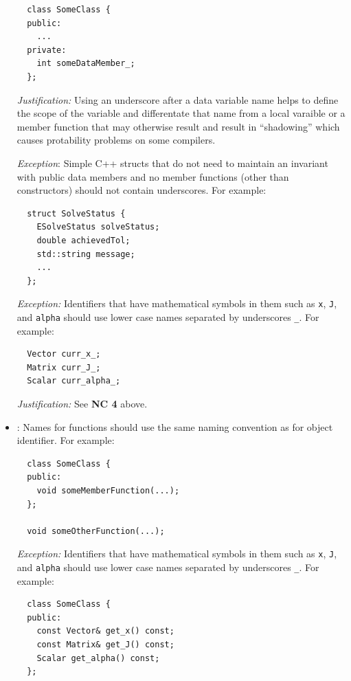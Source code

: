 \begin{itemize}
{\small\begin{verbatim}
  class SomeClass {
  public:
    ...
  private:
    int someDataMember_;
  };
\end{verbatim}}

{}\textit{Justification:} Using an underscore after a data variable
name helps to define the scope of the variable and differentate that
name from a local varaible or a member function that may otherwise
result and result in ``shadowing'' which causes protability problems
on some compilers.

{}\textit{Exception}: Simple C++ structs that do not need to maintain an
invariant with public data members and no member functions (other than
constructors) should not contain underscores.  For example:

{\small\begin{verbatim}
  struct SolveStatus {
    ESolveStatus solveStatus;
    double achievedTol;
    std::string message;
    ...
  };
\end{verbatim}}

{}\textit{Exception:} Identifiers that have mathematical symbols in them such
as {}\texttt{x}, {}\texttt{J}, and {}\texttt{alpha} should use lower case
names separated by underscores {}\texttt{\_}.  For example:

{\small\begin{verbatim}
  Vector curr_x_;
  Matrix curr_J_;
  Scalar curr_alpha_;
\end{verbatim}}

{}\textit{Justification:} See {}\textbf{NC 4} above.

{}\item\NCFunctionNames: Names for functions should use the same
naming convention as for object identifier.  For example:

{\small\begin{verbatim}
  class SomeClass {
  public:
    void someMemberFunction(...);
  };

  void someOtherFunction(...);
\end{verbatim}}

{}\textit{Exception:} Identifiers that have mathematical symbols in them such
as {}\texttt{x}, {}\texttt{J}, and {}\texttt{alpha} should use lower case
names separated by underscores {}\texttt{\_}.  For example:

{\small\begin{verbatim}
  class SomeClass {
  public:
    const Vector& get_x() const;
    const Matrix& get_J() const;
    Scalar get_alpha() const;
  };
\end{verbatim}}


\end{itemize}
